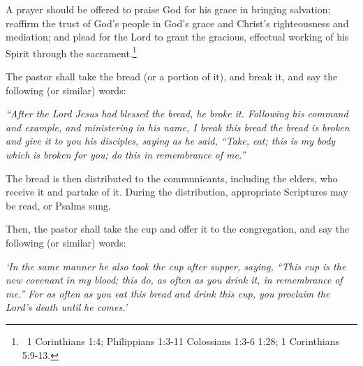 \begin{outerlst}[left=0pt,labelsep=0pt]
\begin{innerlst}[resume*]
      \item A prayer should be offered to praise God for his grace in bringing salvation; reaffirm the trust of God's people in God's grace and Christ's righteousness and mediation; and plead for the Lord to grant the gracious, effectual working of his Spirit through the sacrament.\footnote{\ 1 Corinthians 1:4; Philippians 1:3-11 Colossians 1:3-6 1:28; 1 Corinthians 5:9-13.} 
      \item The pastor shall take the bread (or a portion of it), and break it, and say the following (or similar) words: 
\end{innerlst}
\textit{{``After the Lord Jesus had}}\textit{ blessed the bread}\textit{, he broke it. Following his command and example, and ministering in his name, I break this bread the bread is broken and give it to you his disciples, saying as he said, ``Take, eat; this is my body which}\textit{ is broken for you; do this in remembrance}\textit{ of me.''}  

\begin{innerlst}[resume*]
      \item The bread is then distributed to the communicants, including the elders, who receive it and partake of it. During the distribution, appropriate Scriptures may be read, or Psalms sung. 
      \item Then, the pastor shall take the cup and offer it to the congregation, and say the following (or similar) words: 
\end{innerlst}
\textit{{`In the same manner he also took the cup}}\textit{ after supper, saying, ``This cup is the new covenant}\textit{ in my blood; this do, as often as you drink it, in remembrance}\textit{ of me.'' For as often as you eat this bread}\textit{ and drink this cup, you proclaim the Lord's death until}\textit{ he comes.'}  


\end{outerlst}
